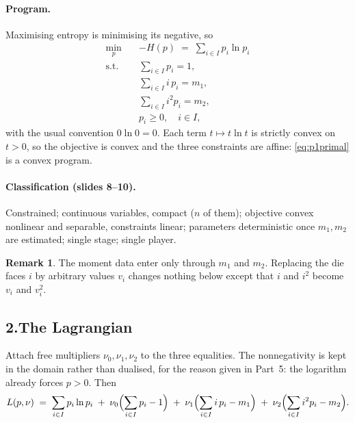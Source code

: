 \documentclass[11pt]{article}
\DeclareMathOperator*{\minimize}{min}
\theoremstyle{definition}
\newtheorem{remark}{Remark}
\begin{document}
\paragraph{Program.} Maximising entropy is minimising its negative, so
\begin{equation}\label{eq:p1primal}
\begin{aligned}
  \minimize_{p}\quad & -H(p) \;=\; \sum_{i \in I} p_i \ln p_i\\
  \text{s.t.}\quad   & \sum_{i \in I} p_i = 1,\\
                     & \sum_{i \in I} i\, p_i = m_1,\\
                     & \sum_{i \in I} i^2 p_i = m_2,\\
                     & p_i \ge 0, \quad i \in I,
\end{aligned}
\end{equation}
with the usual convention $0\ln 0 = 0$. Each term $t \mapsto t \ln t$
is strictly convex on $t > 0$, so the objective is convex and the three
constraints are affine: \eqref{eq:p1primal} is a convex program.

\paragraph{Classification (slides 8--10).} Constrained; continuous
variables, compact ($n$ of them); objective convex nonlinear and
separable, constraints linear; parameters deterministic once $m_1, m_2$
are estimated; single stage; single player.

\begin{remark}
The moment data enter only through $m_1$ and $m_2$. Replacing the die
faces $i$ by arbitrary values $v_i$ changes nothing below except that
$i$ and $i^2$ become $v_i$ and $v_i^2$.
\end{remark}

\subsection*{2.\quad The Lagrangian}

Attach free multipliers $\nu_0, \nu_1, \nu_2$ to the three equalities.
The nonnegativity is kept in the domain rather than dualised, for the
reason given in Part~5: the logarithm already forces $p > 0$. Then
\begin{equation}\label{eq:p1lag}
  L(p,\nu) \;=\; \sum_{i \in I} p_i \ln p_i
    \;+\; \nu_0\Bigl(\sum_{i \in I} p_i - 1\Bigr)
    \;+\; \nu_1\Bigl(\sum_{i \in I} i\,p_i - m_1\Bigr)
    \;+\; \nu_2\Bigl(\sum_{i \in I} i^2 p_i - m_2\Bigr).
\end{equation}
\end{document}
